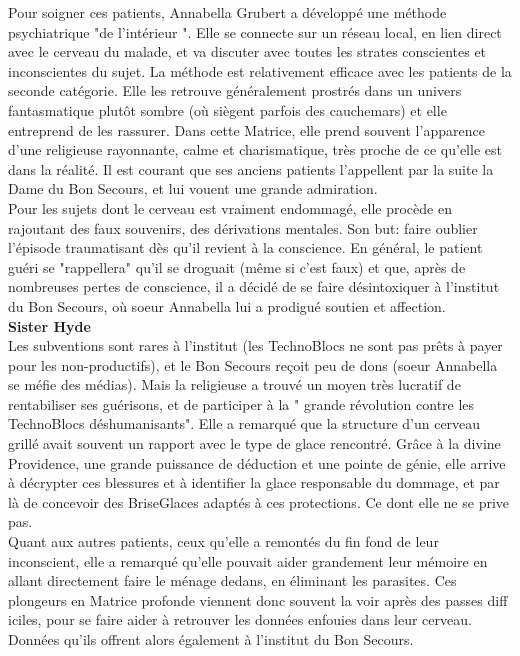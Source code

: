 \documentclass[11pt,twoside,a4paper]{article}
\begin{document}
\begin{multicols}{2}
{Pour soigner ces patients, Annabella Grubert a d{\'e}velopp{\'e} une m{\'e}thode psychiatrique "de l'int{\'e}rieur ". Elle se connecte sur un r{\'e}seau local, en lien direct avec le cerveau du malade, et va discuter avec toutes les strates conscientes et inconscientes du sujet. La m{\'e}thode est relativement efficace avec les patients de la seconde cat{\'e}gorie. Elle les retrouve g{\'e}n{\'e}ralement prostr{\'e}s dans un univers fantasmatique plut{\^o}t sombre (o{\`u} si{\`e}gent parfois des cauchemars) et elle entreprend de les rassurer. Dans cette Matrice, elle prend souvent l'apparence d'une religieuse rayonnante, calme et charismatique, tr{\`e}s proche de ce qu'elle est dans la r{\'e}alit{\'e}. Il est courant que ses anciens patients l'appellent par la suite la Dame du Bon Secours, et lui vouent une grande admiration.~\\

Pour les sujets dont le cerveau est vraiment endommag{\'e}, elle proc{\`e}de en rajoutant des faux souvenirs, des d{\'e}rivations mentales. Son but: faire oublier l'{\'e}pisode traumatisant d{\`e}s qu'il revient {\`a} la conscience. En g{\'e}n{\'e}ral, le patient gu{\'e}ri se "rappellera" qu'il se droguait (m{\^e}me si c'est faux) et que, apr{\`e}s de nombreuses pertes de conscience, il a d{\'e}cid{\'e} de se faire d{\'e}sintoxiquer {\`a} l'institut du Bon Secours, o{\`u} soeur Annabella lui a prodigu{\'e} soutien et affection.~\\

\textbf{\Large Sister Hyde}~\\

Les subventions sont rares {\`a} l'institut (les TechnoBlocs ne sont pas pr{\^e}ts {\`a} payer pour les non-productifs), et le Bon Secours re\c{c}oit peu de dons (soeur Annabella se m{\'e}fie des m{\'e}dias). Mais la religieuse a trouv{\'e} un moyen tr{\`e}s lucratif de rentabiliser ses gu{\'e}risons, et de participer {\`a} la " grande r{\'e}volution contre les TechnoBlocs d{\'e}shumanisants". Elle a remarqu{\'e} que la structure d'un cerveau grill{\'e} avait souvent un rapport avec le type de glace rencontr{\'e}. Gr{\^a}ce {\`a} la divine Providence, une grande puissance de d{\'e}duction et une pointe de g{\'e}nie, elle arrive {\`a} d{\'e}crypter ces blessures et {\`a} identifier la glace responsable du dommage, et par l{\`a} de concevoir des BriseGlaces adapt{\'e}s {\`a} ces protections. Ce dont elle ne se prive pas.~\\

Quant aux autres patients, ceux qu'elle a remont{\'e}s du fin fond de leur inconscient, elle a remarqu{\'e} qu'elle pouvait aider grandement leur m{\'e}moire en allant directement faire le m{\'e}nage dedans, en {\'e}liminant les parasites. Ces plongeurs en Matrice profonde viennent donc souvent la voir apr{\`e}s des passes diff iciles, pour se faire aider {\`a} retrouver les donn{\'e}es enfouies dans leur cerveau. Donn{\'e}es qu'ils offrent alors {\'e}galement {\`a} l'institut du Bon Secours.~\\

}
\end{multicols}
\end{document}
